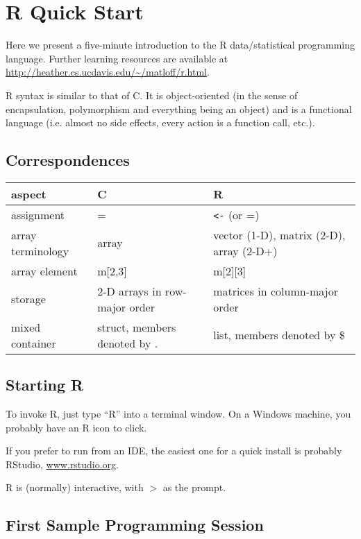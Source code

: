 \chapter{R Quick Start}
\label{chap:rquickstart}

Here we present a five-minute introduction to the R data/statistical
programming language.  Further learning resources are available at
\url{http://heather.cs.ucdavis.edu/~/matloff/r.html}.

R syntax is similar to that of C. It is object-oriented (in the sense of
encapsulation, polymorphism and everything being an object) and is a
functional language (i.e. almost no side effects, every action is a
function call, etc.).

\section{Correspondences}

\begin{tabular}{|l|l|l|}
\hline
aspect & C & R \\ \hline 
\hline
assignment & = & \verb#<-# (or =) \\ \hline 
array terminology & array & vector (1-D), matrix (2-D), array (2-D+) \\ \hline 
array element & m[2,3] & m[2][3] \\ \hline 
storage & 2-D arrays in row-major order & matrices in column-major order \\ \hline 
mixed container &struct, members denoted by . & list, members denoted by \$ \\ \hline 
\end{tabular}

\section{Starting R}

To invoke R, just type ``R'' into a terminal window. On a Windows
machine, you probably have an R icon to click.  

If you prefer to run from an IDE, the easiest one for a quick install is
probably RStudio, \url{www.rstudio.org}.

R is (normally) interactive, with $>$ as the prompt.

\section{First Sample Programming Session}

